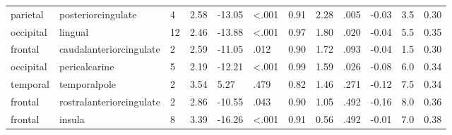 \documentclass{article}
\begin{document}
\begin{longtable}{llR{1.5cm}R{1cm}R{1.3cm}R{1cm}R{1cm}R{1.3cm}R{1cm}R{1.8cm}R{1.3cm}R{1.8cm}}
  parietal &        posteriorcingulate &            4 &                  2.58 &           -13.05 &      \textless.001 &                               0.91 &                          2.28 &                            .005 & -0.03 &    3.5 &      0.30 \\
 occipital &                   lingual &           12 &                  2.46 &           -13.88 &      \textless.001 &                               0.97 &                          1.80 &                            .020 & -0.04 &    5.5 &      0.35 \\
   frontal &   caudalanteriorcingulate &            2 &                  2.59 &           -11.05 &               .012 &                               0.90 &                          1.72 &                            .093 & -0.04 &    1.5 &      0.30 \\
 occipital &             pericalcarine &            5 &                  2.19 &           -12.21 &      \textless.001 &                               0.99 &                          1.59 &                            .026 & -0.08 &    6.0 &      0.34 \\
  temporal &              temporalpole &            2 &                  3.54 &             5.27 &               .479 &                               0.82 &                          1.46 &                            .271 & -0.12 &    7.5 &      0.34 \\
   frontal &  rostralanteriorcingulate &            2 &                  2.86 &           -10.55 &               .043 &                               0.90 &                          1.05 &                            .492 & -0.16 &    8.0 &      0.36 \\
   frontal &                    insula &            8 &                  3.39 &           -16.26 &      \textless.001 &                               0.91 &                          0.56 &                            .492 & -0.01 &    7.0 &      0.38 \\
\end{longtable}
\end{document}
